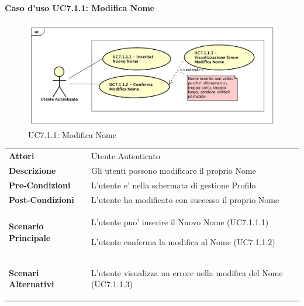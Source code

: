 \newpage
\paragraph{Caso d'uso UC7.1.1:  Modifica Nome}
\label{UC7_1_1}
\begin{figure}[ht]
	\centering
	\includegraphics[scale=0.45]{UML/UC7_1_1.png}
	\caption{UC7.1.1:  Modifica Nome}
\end{figure}
\FloatBarrier
\begin{tabular}{ l | p{11cm}}
	\hline
	\rowcolor{Gray}
	 \multicolumn{2}{c}{UC7.1.1 - Modifica Nome} \\
	 \hline
	\textbf{Attori} & Utente Autenticato \\
	\textbf{Descrizione} & Gli utenti possono modificare il proprio Nome\\
	\textbf{Pre-Condizioni} & L'utente e' nella schermata di gestione Profilo\\
	\textbf{Post-Condizioni} & L'utente ha modificato con successo il proprio Nome \\
	\textbf{Scenario Principale} & 
	\begin{enumerate*}[label=(\arabic*.),itemjoin={\newline}]
		\item L'utente puo' inserire il Nuovo Nome (UC7.1.1.1)
		\item L'utente conferma la modifica al Nome (UC7.1.1.2)
	\end{enumerate*}\\
	\textbf{Scenari Alternativi} & 
	\begin{enumerate*}[label=(\arabic*.),itemjoin={\newline}]
		\item L'utente visualizza un errore nella modifica del Nome (UC7.1.1.3)
	\end{enumerate*}\\
\end{tabular}
